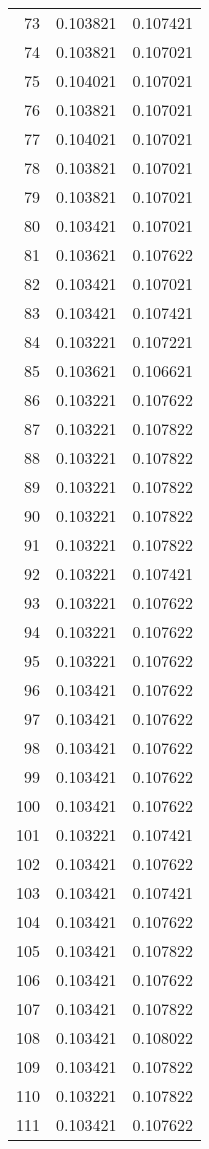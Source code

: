 \begin{longtable}{rrr}
73 & 0.103821 & 0.107421 \\
74 & 0.103821 & 0.107021 \\
75 & 0.104021 & 0.107021 \\
76 & 0.103821 & 0.107021 \\
77 & 0.104021 & 0.107021 \\
78 & 0.103821 & 0.107021 \\
79 & 0.103821 & 0.107021 \\
80 & 0.103421 & 0.107021 \\
81 & 0.103621 & 0.107622 \\
82 & 0.103421 & 0.107021 \\
83 & 0.103421 & 0.107421 \\
84 & 0.103221 & 0.107221 \\
85 & 0.103621 & 0.106621 \\
86 & 0.103221 & 0.107622 \\
87 & 0.103221 & 0.107822 \\
88 & 0.103221 & 0.107822 \\
89 & 0.103221 & 0.107822 \\
90 & 0.103221 & 0.107822 \\
91 & 0.103221 & 0.107822 \\
92 & 0.103221 & 0.107421 \\
93 & 0.103221 & 0.107622 \\
94 & 0.103221 & 0.107622 \\
95 & 0.103221 & 0.107622 \\
96 & 0.103421 & 0.107622 \\
97 & 0.103421 & 0.107622 \\
98 & 0.103421 & 0.107622 \\
99 & 0.103421 & 0.107622 \\
100 & 0.103421 & 0.107622 \\
101 & 0.103221 & 0.107421 \\
102 & 0.103421 & 0.107622 \\
103 & 0.103421 & 0.107421 \\
104 & 0.103421 & 0.107622 \\
105 & 0.103421 & 0.107822 \\
106 & 0.103421 & 0.107622 \\
107 & 0.103421 & 0.107822 \\
108 & 0.103421 & 0.108022 \\
109 & 0.103421 & 0.107822 \\
110 & 0.103221 & 0.107822 \\
111 & 0.103421 & 0.107622 \\

\end{longtable}
